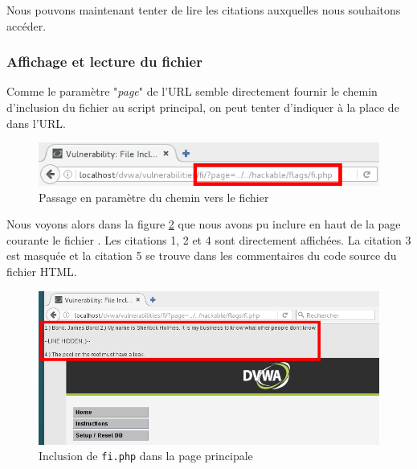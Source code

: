 Nous pouvons maintenant tenter de lire les citations auxquelles nous souhaitons accéder.

\subsubsection{Affichage et lecture du fichier}


Comme le paramètre "\textit{page}" de l'URL semble directement fournir le chemin d'inclusion du fichier au script principal, on peut tenter d'indiquer  à la place de  dans l'URL.

\begin{figure}[!h]
\begin{center}
\includegraphics[scale=.6]{images/fi3.png}

\caption{Passage en paramètre du chemin vers le fichier}
\label{fi_dvwa3}
\end{center}
\end{figure}


Nous voyons alors dans la figure \ref{fi_dvwa4} que nous avons pu inclure en haut de la page courante le fichier . Les citations 1, 2 et 4 sont directement affichées. La citation 3 est masquée et la citation 5 se trouve dans les commentaires du code source du fichier HTML.

\begin{figure}[!h]
\begin{center}
\includegraphics[scale=.6]{images/fi4.png}

\caption{Inclusion de \texttt{fi.php} dans la page principale}
\label{fi_dvwa4}
\end{center}
\end{figure}

